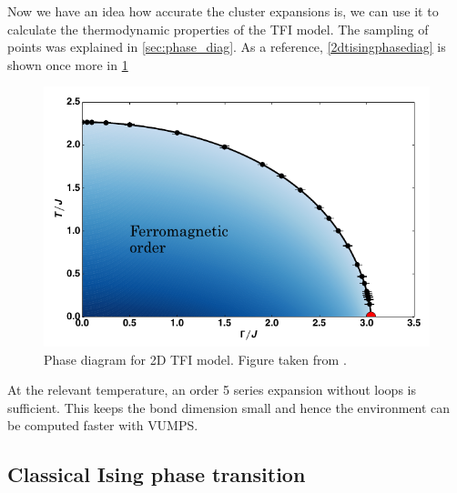 
Now we have an idea how accurate the cluster expansions is, we can use it to calculate the thermodynamic properties of the \Gls{TFI} model. The sampling of points was explained in \cref{sec:phase_diag}. As a reference, \cref{2dtisingphasediag} is shown once more in \cref{2dtisingphasediag2}
\begin{figure}[!htbp]
    \center
    \includegraphics[width=\textwidth]{Figuren/phsyics/2disingphase.png}
    \caption{Phase diagram for 2D \Gls{TFI} model. Figure taken from \cite{Hesselmann2016}.}
    \label{2dtisingphasediag2}
\end{figure}
At the relevant temperature, an order 5 series expansion without loops is sufficient. This keeps the bond dimension small and hence the environment can be computed faster with \Gls{VUMPS}.

\subsection{Classical Ising phase transition}

